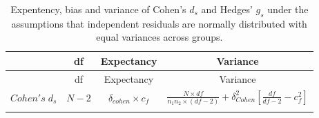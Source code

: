 \documentclass[
  man,floatsintext]{apa6}
\begin{document}
\newpage
\begin{landscape}

\begin{longtable}[]{@{}lccc@{}}
\caption{Expentency, bias and variance of Cohen's \(d_s\) and Hedges' \(g_s\) under the assumptions that independent residuals are normally distributed with equal variances across groups.}\tabularnewline
\toprule
\begin{minipage}[b]{0.12\columnwidth}\raggedright
\strut
\end{minipage} & \begin{minipage}[b]{0.11\columnwidth}\centering
df\strut
\end{minipage} & \begin{minipage}[b]{0.24\columnwidth}\centering
Expectancy\strut
\end{minipage} & \begin{minipage}[b]{0.42\columnwidth}\centering
Variance\strut
\end{minipage}\tabularnewline
\midrule
\endfirsthead
\toprule
\begin{minipage}[b]{0.12\columnwidth}\raggedright
\strut
\end{minipage} & \begin{minipage}[b]{0.11\columnwidth}\centering
df\strut
\end{minipage} & \begin{minipage}[b]{0.24\columnwidth}\centering
Expectancy\strut
\end{minipage} & \begin{minipage}[b]{0.42\columnwidth}\centering
Variance\strut
\end{minipage}\tabularnewline
\midrule
\endhead
\begin{minipage}[t]{0.12\columnwidth}\raggedright
\(Cohen's \; d_s\)\strut
\end{minipage} & \begin{minipage}[t]{0.11\columnwidth}\centering
\(N-2\)\strut
\end{minipage} & \begin{minipage}[t]{0.24\columnwidth}\centering
\(\delta_{cohen} \times c_f\)\strut
\end{minipage} & \begin{minipage}[t]{0.42\columnwidth}\centering
\(\frac{N\times df}{n_1n_2 \times (df-2)} + \delta^2_{Cohen} \left[ \frac{df}{df-2} - c_f^2\right]\)\strut
\end{minipage}\tabularnewline
\begin{minipage}[t]{0.12\columnwidth}\raggedright
\strut

\end{minipage}
\end{longtable}
\end{landscape}
\end{document}
